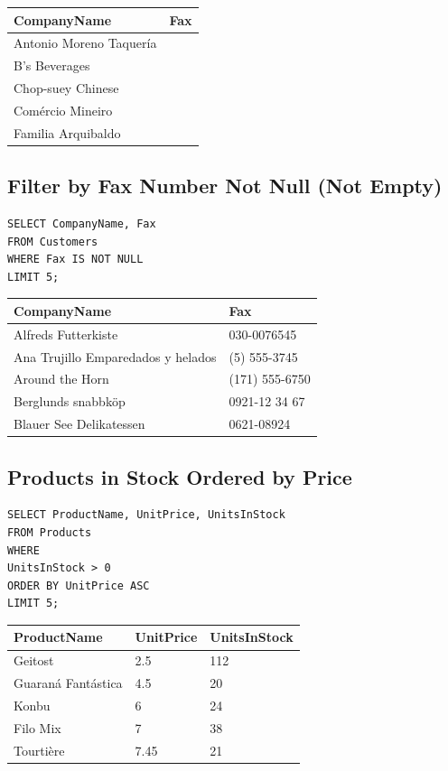 \documentclass[10pt]{article}
\begin{document}
\begin{table}[H]
\begin{tabular}{|l|l|}
\hline
CompanyName	& Fax \\
\hline
Antonio Moreno Taquería	& \\
B's Beverages	& \\
Chop-suey Chinese	& \\
Comércio Mineiro	& \\
Familia Arquibaldo	& \\
\hline
\end{tabular}
\end{table}

\subsection{Filter by Fax Number Not Null (Not Empty)}
\begin{verbatim}
SELECT CompanyName, Fax 
FROM Customers 
WHERE Fax IS NOT NULL
LIMIT 5;
\end{verbatim}


\begin{table}[H]
\begin{tabular}{|l|l|}
\hline
CompanyName	& Fax \\
\hline
Alfreds Futterkiste	& 030-0076545 \\
Ana Trujillo Emparedados y helados	& (5) 555-3745 \\
Around the Horn	& (171) 555-6750 \\
Berglunds snabbköp	& 0921-12 34 67 \\
Blauer See Delikatessen	& 0621-08924 \\
\hline
\end{tabular}
\end{table}



\subsection{Products in Stock Ordered by Price}
\begin{verbatim}
SELECT ProductName, UnitPrice, UnitsInStock 
FROM Products 
WHERE 
UnitsInStock > 0
ORDER BY UnitPrice ASC
LIMIT 5;
\end{verbatim}

\begin{table}[H]
\begin{tabular}{|l|l|l|}
\hline
ProductName	& UnitPrice	& UnitsInStock \\
\hline
Geitost	& 2.5	& 112 \\
Guaraná Fantástica	& 4.5	& 20 \\
Konbu	& 6	& 24 \\
Filo Mix	& 7	& 38 \\
Tourtière	& 7.45	& 21 \\
\hline
\end{tabular}
\end{table}
\end{document}
